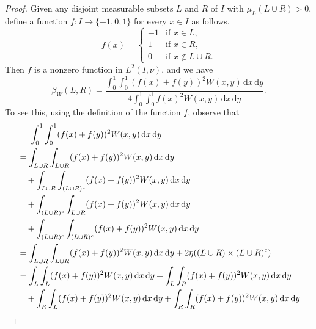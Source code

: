 \documentclass[12pt,a4paper,bold]{thesis}
\theoremstyle{definition}
\newcommand*{\map}[3]{#1 \colon #2 \to #3}
\begin{document}
\begin{proof}
    Given any disjoint measurable subsets $L$ and $R$ of $I$ with $\mu_L(L \cup R) > 0$,
    define a function $\map{f}{I}{\{-1,0,1\}}$ for every $x \in I$ as follows.
    \begin{equation*}
        f(x) = 
        \begin{cases}
            -1 & \text{if } x \in L,
            \\
            1 & \text{if } x \in R,
            \\
            0 & \text{if } x \notin L \cup R.
        \end{cases}
    \end{equation*}
    Then $f$ is a nonzero function in $L^2(I, \nu)$, and we have
    \begin{equation} \label{eq:partitions<->fns}
        \beta_W(L,R)
        = \frac{\int_{0}^{1} \int_{0}^{1} (f(x) + f(y))^2 W(x,y)\, \mathrm{d}x\, \mathrm{d}y}
        {4 \int_0^1 \int_0^1 f(x)^2 W(x,y)\, \mathrm{d}x\, \mathrm{d}y}.
    \end{equation}
    To see this, using the definition of the function $f$, observe that
    \begin{align*}
        & \hspace{0.49cm}
        \int_{0}^{1} \int_{0}^{1} (f(x) + f(y))^2 W(x,y)\, \mathrm{d}x\, \mathrm{d}y 
        \\
        & = 
        \int_{L \cup R} \int_{L \cup R} (f(x) + f(y))^2 W(x,y)\, \mathrm{d}x\, \mathrm{d}y
        \\
        & \quad +
        \int_{L \cup R} \int_{(L \cup R)^c} (f(x) + f(y))^2 W(x,y)\, \mathrm{d}x\, \mathrm{d}y
        \\
        & \quad +
        \int_{(L \cup R)^c} \int_{L \cup R} (f(x) + f(y))^2 W(x,y)\, \mathrm{d}x\, \mathrm{d}y
        \\
        & \quad +
        \int_{(L \cup R)^c} \int_{(L \cup R)^c} (f(x) + f(y))^2 W(x,y)\, \mathrm{d}x\, \mathrm{d}y
        \\
        & =
        \int_{L \cup R} \int_{L \cup R} (f(x) + f(y))^2 W(x,y)\, \mathrm{d}x\, \mathrm{d}y
        + 2 \eta((L \cup R) \times (L \cup R)^c)
        \\
        & = 
        \int_L \int_L (f(x) + f(y))^2 W(x,y)\, \mathrm{d}x\, \mathrm{d}y
        + \int_L \int_R (f(x) + f(y))^2 W(x,y)\, \mathrm{d}x\, \mathrm{d}y 
        \\
        & \quad +
        \int_R \int_L (f(x) + f(y))^2 W(x,y)\, \mathrm{d}x\, \mathrm{d}y
        + \int_R \int_R (f(x) + f(y))^2 W(x,y)\, \mathrm{d}x\, \mathrm{d}y 

\end{align*}
\end{proof}
\end{document}
